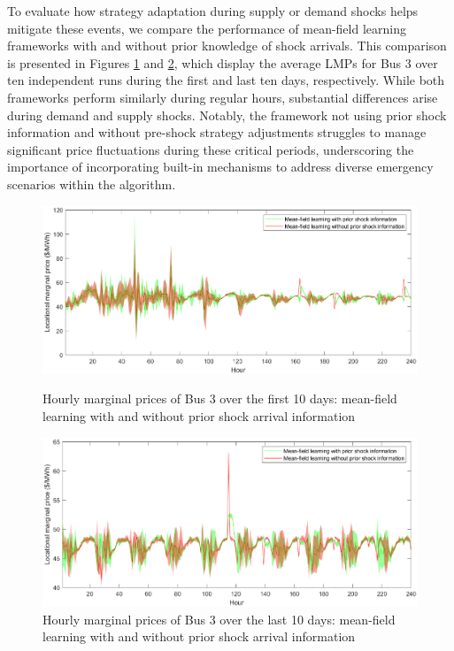 \documentclass{article}
\theoremstyle{definition}
\theoremstyle{plain}
\begin{document}
To evaluate how strategy adaptation during supply or demand shocks helps mitigate these events, we compare the performance of mean-field learning frameworks with and without prior knowledge of shock arrivals. This comparison is presented in Figures \ref{fig:f10days_shock} and \ref{fig:l10days_shock}, which display the average LMPs for Bus 3 over ten independent runs during the first and last ten days, respectively. While both frameworks perform similarly during regular hours, substantial differences arise during demand and supply shocks. Notably, the framework not using prior shock information and without pre-shock strategy adjustments struggles to manage significant price fluctuations during these critical periods, underscoring the importance of incorporating built-in mechanisms to address diverse emergency scenarios within the algorithm.

\begin{figure}[!h]
\centering
    {\includegraphics[width=\textwidth]{shockcomparefirst10.eps}}
   \caption{Hourly marginal prices of Bus 3 over the first 10 days: mean-field learning with and without prior shock arrival information} 
    \label{fig:f10days_shock}    
    {}
\end{figure}

\begin{figure}[!h]
   \centering
   \includegraphics[width=\textwidth]{shockcomparelast10.eps}
 \caption{Hourly marginal prices of Bus 3 over the last 10 days: mean-field learning with and without prior shock arrival information}
    \label{fig:l10days_shock} 
\end{figure}
\end{document}
